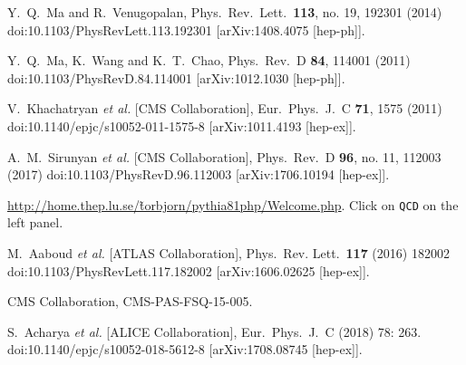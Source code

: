 \documentclass[12pt]{article}
\begin{document}
\begin{thebibliography}{1}
  Y.~Q.~Ma and R.~Venugopalan,
  Phys.\ Rev.\ Lett.\  {\bf 113}, no. 19, 192301 (2014)
  doi:10.1103/PhysRevLett.113.192301
  [arXiv:1408.4075 [hep-ph]].

  
  Y.~Q.~Ma, K.~Wang and K.~T.~Chao,
  Phys.\ Rev.\ D {\bf 84}, 114001 (2011)
  doi:10.1103/PhysRevD.84.114001
  [arXiv:1012.1030 [hep-ph]].

  V.~Khachatryan {\it et al.} [CMS Collaboration],
  Eur.\ Phys.\ J.\ C {\bf 71}, 1575 (2011)
  doi:10.1140/epjc/s10052-011-1575-8
  [arXiv:1011.4193 [hep-ex]].

  
  A.~M.~Sirunyan {\it et al.} [CMS Collaboration],
  Phys.\ Rev.\ D {\bf 96}, no. 11, 112003 (2017)
  doi:10.1103/PhysRevD.96.112003
  [arXiv:1706.10194 [hep-ex]].
   
\href{http://home.thep.lu.se/\~torbjorn/pythia81php/Welcome.php}
{http://home.thep.lu.se/\~torbjorn/pythia81php/Welcome.php}.  Click on 
{\tt QCD} on the left panel.

  M.~Aaboud {\it et al.} [ATLAS Collaboration],
  Phys.\ Rev. Lett.\ {\bf 117} (2016) 182002
  doi:10.1103/PhysRevLett.117.182002
  [arXiv:1606.02625 [hep-ex]].

  CMS Collaboration,
  CMS-PAS-FSQ-15-005.

  S.~Acharya {\it et al.} [ALICE Collaboration],
  Eur.\ Phys.\ J.\ C (2018) 78: 263.
  doi:10.1140/epjc/s10052-018-5612-8
  [arXiv:1708.08745 [hep-ex]].


\end{thebibliography}
\end{document}
